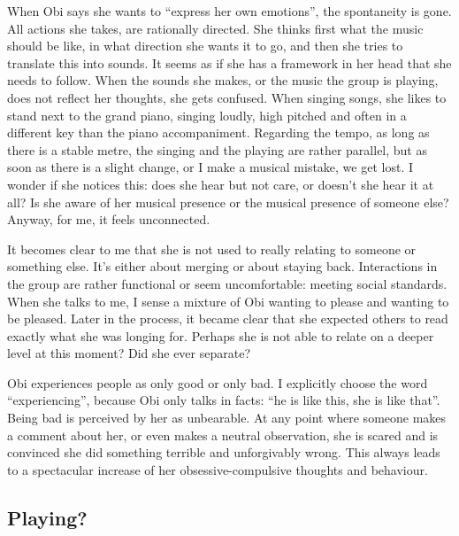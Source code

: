 \documentclass[authordate, empirical, issue]{jote-new-article}
\begin{document}
When Obi says she wants to “express her own emotions”, the spontaneity is gone. All actions she takes, are rationally directed. She thinks first what the music should be like, in what direction she wants it to go, and then she tries to translate this into sounds. It seems as if she has a framework in her head that she needs to follow. When the sounds she makes, or the music the group is playing, does not reflect her thoughts, she gets confused. When singing songs, she likes to stand next to the grand piano, singing loudly, high pitched and often in a different key than the piano accompaniment. Regarding the tempo, as long as there is a stable metre, the singing and the playing are rather parallel, but as soon as there is a slight change, or I make a musical mistake, we get lost. I wonder if she notices this: does she hear but not care, or doesn't she hear it at all? Is she aware of her musical presence or the musical presence of someone else? Anyway, for me, it feels unconnected.



It becomes clear to me that she is not used to really relating to someone or something else. It's either about merging or about staying back. Interactions in the group are rather functional or seem uncomfortable: meeting social standards. When she talks to me, I sense a mixture of Obi wanting to please and wanting to be pleased. Later in the process, it became clear that she expected others to read exactly what she was longing for. Perhaps she is not able to relate on a deeper level at this moment? Did she ever separate?



Obi experiences people as only good or only bad. I explicitly choose the word “experiencing”, because Obi only talks in facts: “he is like this, she is like that”. Being bad is perceived by her as unbearable. At any point where someone makes a comment about her, or even makes a neutral observation, she is scared and is convinced she did something terrible and unforgivably wrong. This always leads to a spectacular increase of her obsessive-compulsive thoughts and behaviour.







\subsection{Playing?}
\end{document}
